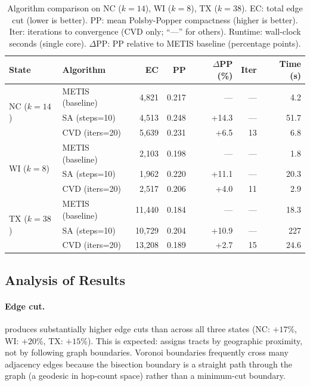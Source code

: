 \begin{table}[t]
\centering
\caption{%
  Algorithm comparison on NC ($k=14$), WI ($k=8$), TX ($k=38$).
  EC: total edge cut (lower is better).
  PP: mean Polsby-Popper compactness (higher is better).
  Iter: iterations to convergence (CVD only; ``---'' for others).
  Runtime: wall-clock seconds (single core).
  $\Delta$PP: PP relative to METIS baseline (percentage points).
}
\label{tab:main}
\renewcommand{\arraystretch}{1.25}
\begin{tabular}{@{}llrrrrr@{}}
\toprule
State & Algorithm & EC & PP & $\Delta$PP (\%) & Iter & Time (s) \\
\midrule
\multirow{3}{*}{NC ($k=14$)}
 & METIS (baseline)   & 4{,}821 & 0.217 & ---   & --- &  4.2 \\
 & SA (steps=10)      & 4{,}513 & 0.248 & +14.3 & --- & 51.7 \\
 & CVD (iters=20)     & 5{,}639 & 0.231 & +6.5  & 13  &  6.8 \\
\midrule
\multirow{3}{*}{WI ($k=8$)}
 & METIS (baseline)   & 2{,}103 & 0.198 & ---   & --- &  1.8 \\
 & SA (steps=10)      & 1{,}962 & 0.220 & +11.1 & --- & 20.3 \\
 & CVD (iters=20)     & 2{,}517 & 0.206 & +4.0  & 11  &  2.9 \\
\midrule
\multirow{3}{*}{TX ($k=38$)}
 & METIS (baseline)   & 11{,}440 & 0.184 & ---   & --- &  18.3 \\
 & SA (steps=10)      & 10{,}729 & 0.204 & +10.9 & --- & 227 \\
 & CVD (iters=20)     & 13{,}208 & 0.189 & +2.7  & 15  &  24.6 \\
\bottomrule
\end{tabular}
\end{table}

\subsection{Analysis of Results}

\paragraph{Edge cut.}
\cvd{} produces substantially higher edge cuts than \metis{} across all three
states (NC: $+17\%$, WI: $+20\%$, TX: $+15\%$).
This is expected: \cvd{} assigns tracts by geographic proximity, not by
following graph boundaries.
Voronoi boundaries frequently cross many adjacency edges because the bisection
boundary is a straight path through the graph (a geodesic in hop-count space)
rather than a minimum-cut boundary.

